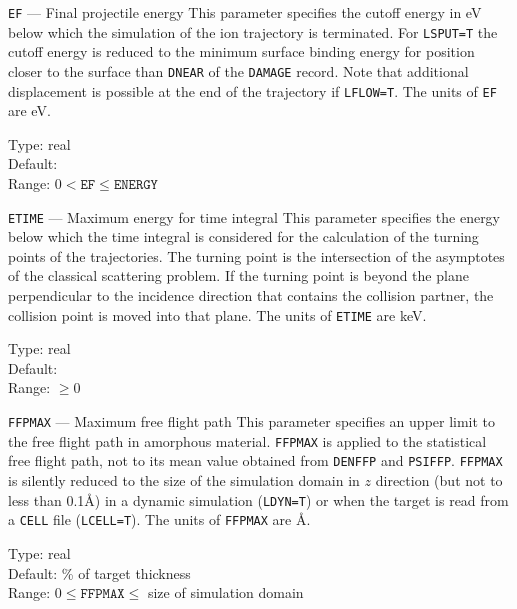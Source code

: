 \begin{keydescription}{\texttt{EF} --- Final projectile energy}
%
  This parameter specifies the cutoff energy in eV below which the
  simulation of the ion trajectory is terminated. For \texttt{LSPUT=T} the
  cutoff energy is reduced to the minimum surface binding energy for position
  closer to the surface than \texttt{DNEAR} of the \texttt{DAMAGE} record.
  Note that additional displacement is possible at the end of the trajectory if
  \texttt{LFLOW=T}. The units of \texttt{EF} are eV. 
  \begin{keytab}
    Type:    \> real \\
    Default:  \\
    Range:   \> $0 < \texttt{EF} \le \texttt{ENERGY}$
  \end{keytab}
\end{keydescription}

\begin{keydescription}{\texttt{ETIME} --- Maximum energy for time integral}
%
  This parameter specifies the energy below which the time
  integral is considered for the calculation of the turning points of
  the trajectories. The turning point is the intersection of the asymptotes
  of the classical scattering problem. If the turning point is beyond the
  plane perpendicular to the incidence direction that contains the collision
  partner, the collision point is moved into that plane. The units of
  \texttt{ETIME} are keV.
  \begin{keytab}
    Type:    \> real \\
    Default:  \\
    Range:   \> $\ge 0$
  \end{keytab}
\end{keydescription}

\begin{keydescription}{\texttt{FFPMAX} --- Maximum free flight path}
%
  This parameter specifies an upper limit to the free flight path in amorphous
  material.  \texttt{FFPMAX} is applied to the statistical free flight path, not
  to its mean value obtained from \texttt{DENFFP} and \texttt{PSIFFP}. 
  \texttt{FFPMAX} is silently reduced to the size of the simulation domain in
  $z$ direction (but not to less than 0.1\AA) in a dynamic simulation
  (\texttt{LDYN=T}) or when the target is read from a \texttt{CELL} file
  (\texttt{LCELL=T}). The units of \texttt{FFPMAX} are \AA.
  \begin{keytab}
    Type:    \> real \\
    Default: \% of target thickness \\
    Range:   \> $0 \le \texttt{FFPMAX} \le$ size of simulation domain
  \end{keytab}
\end{keydescription}

